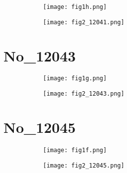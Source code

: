 \documentclass[%
 reprint,
 amsmath,amssymb,
 aps,
]{revtex4-2}
\begin{document}
\begin{figure}[b]

\centering

\quad
    \begin{subfigure}[b]{0.45\textwidth}
    \centering
    \texttt{[image: fig1h.png]}
    \caption{\label{fig:fig1h.png}}
    \end{subfigure}
\quad
    \begin{subfigure}[b]{0.45\textwidth}
    \centering
    \texttt{[image: fig2\_12041.png]}
    \caption{\label{fig:fig2_12041.png}}
    \end{subfigure}


\captionsetup{justification=raggedright,singlelinecheck=false}
\caption{\label{fig:fig1h.png}}

\end{figure}



\section{No_12043}

\begin{figure}[b]

\centering

\quad
    \begin{subfigure}[b]{0.45\textwidth}
    \centering
    \texttt{[image: fig1g.png]}
    \caption{\label{fig:fig1g.png}}
    \end{subfigure}
\quad
    \begin{subfigure}[b]{0.45\textwidth}
    \centering
    \texttt{[image: fig2\_12043.png]}
    \caption{\label{fig:fig2_12043.png}}
    \end{subfigure}


\captionsetup{justification=raggedright,singlelinecheck=false}
\caption{\label{fig:fig1g.png}}

\end{figure}



\section{No_12045}

\begin{figure}[b]

\centering

\quad
    \begin{subfigure}[b]{0.45\textwidth}
    \centering
    \texttt{[image: fig1f.png]}
    \caption{\label{fig:fig1f.png}}
    \end{subfigure}
\quad
    \begin{subfigure}[b]{0.45\textwidth}
    \centering
    \texttt{[image: fig2\_12045.png]}
    \caption{\label{fig:fig2_12045.png}}
    \end{subfigure}


\captionsetup{justification=raggedright,singlelinecheck=false}
\caption{\label{fig:fig1f.png}}

\end{figure}
\end{document}
